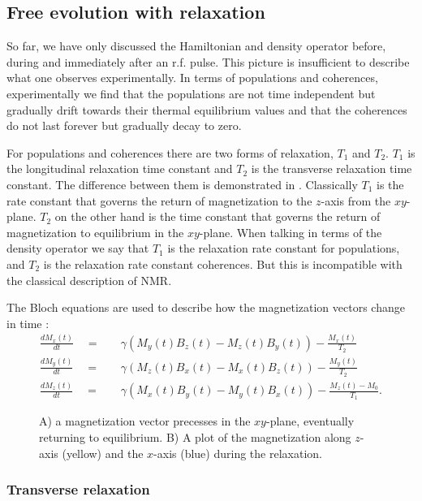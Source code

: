 \subsection{Free evolution with relaxation}\label{Relaxation}

So far, we have only discussed the Hamiltonian and density operator before, during and
immediately after an r.f. pulse. This picture is insufficient to describe what one observes
experimentally. In terms of populations and coherences, experimentally we find that
the populations are not time independent but gradually drift towards their thermal
equilibrium values and that the coherences do not last forever but gradually decay
to zero.

For populations and coherences there are two forms of relaxation, $T_1$ and $T_2$. $T_1$ is the longitudinal relaxation time
constant and $T_2$ is the transverse relaxation time constant. The difference between them is demonstrated in . Classically
$T_1$ is the rate constant that governs the return of magnetization to the $z$-axis from the $xy$-plane. $T_2$ on
the other hand is the time constant that governs the return of magnetization to equilibrium in the $xy$-plane.
When talking in terms of the density operator we say that $T_1$ is the relaxation rate constant for populations, and $T_2$ is the relaxation
rate constant coherences. But this is incompatible with the classical description of NMR.

The Bloch equations are used to describe how the magnetization vectors change in time \citep{Bloch:1946hk}:
\begin{align}
  \frac{dM_x(t)}{dt}\quad=&\quad\gamma(M_y(t)B_z(t)-M_z(t)B_y(t)) - \frac{M_x(t)}{T_2}\\
  \frac{dM_y(t)}{dt}\quad=&\quad\gamma(M_z(t)B_x(t)-M_x(t)B_z(t)) - \frac{M_y(t)}{T_2}\\
  \frac{dM_z(t)}{dt}\quad=&\quad\gamma(M_x(t)B_y(t)-M_y(t)B_x(t)) - \frac{M_z(t)-M_0}{T_1}.
\end{align}

\begin{figure}[h]
  \caption{A) a magnetization vector precesses in the $xy$-plane, eventually returning to equilibrium.
  B) A plot of the magnetization along $z$-axis (yellow) and the $x$-axis (blue) during the relaxation.}
  \label{fig:t1t2}
\end{figure}

\subsubsection{Transverse relaxation}\label{T2}

